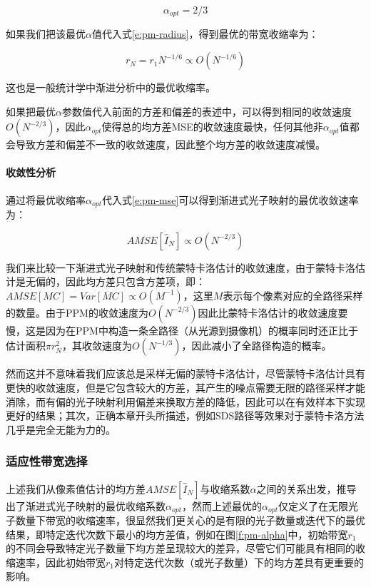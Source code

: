 \begin{equation}
	\alpha_{opt}=2/3
\end{equation}

如果我们把该最优$\alpha$值代入式\ref{e:pm-radius}，得到最优的带宽收缩率为：

\begin{equation}
	r_N=r_1N^{-1/6}\propto O(N^{-1/6})
\end{equation}

这也是一般统计学中渐进分析中的最优收缩率。

如果把最优$\alpha$参数值代入前面的方差和偏差的表述中，可以得到相同的收敛速度$O(N^{-2/3})$，因此$\alpha_{opt}$使得总的均方差MSE的收敛速度最快，任何其他非$\alpha_{opt}$值都会导致方差和偏差不一致的收敛速度，因此整个均方差的收敛速度减慢。





\paragraph{收敛性分析}
通过将最优收缩率$\alpha_{opt}$代入式\ref{e:pm-mse}可以得到渐进式光子映射的最优收敛速率为：

\begin{equation}
	AMSE[\hat{I}_N]\propto O(N^{-2/3})
\end{equation}

我们来比较一下渐进式光子映射和传统蒙特卡洛估计的收敛速度，由于蒙特卡洛估计是无偏的，因此均方差只包含方差项，即：$AMSE[MC]=Var[MC]\propto O(M^{-1})$，这里$M$表示每个像素对应的全路径采样的数量。由于PPM的收敛速度为$O(N^{-2/3})$因此比蒙特卡洛估计的收敛速度要慢，这是因为在PPM中构造一条全路径（从光源到摄像机）的概率同时还正比于估计面积$\pi r^{2}_N$，其收敛速度为$O(N^{-1/3})$，因此减小了全路径构造的概率。

然而这并不意味着我们应该总是采样无偏的蒙特卡洛估计，尽管蒙特卡洛估计具有更快的收敛速度，但是它包含较大的方差，其产生的噪点需要无限的路径采样才能消除，而有偏的光子映射利用偏差来换取方差的降低，因此可以在有效样本下实现更好的结果；其次，正确本章开头所描述，例如SDS路径等效果对于蒙特卡洛方法几乎是完全无能为力的。






\subsubsection{适应性带宽选择}
上述我们从像素值估计的均方差$AMSE[\hat{I}_N]$与收缩系数$\alpha$之间的关系出发，推导出了渐进式光子映射的最优收缩系数$\alpha_{opt}$，然而上述最优的$\alpha_{opt}$仅定义了在无限光子数量下带宽的收缩速率，很显然我们更关心的是有限的光子数量或迭代下的最优结果，即特定迭代次数下最小的均方差值，例如在图\ref{f:pm-alpha}中，初始带宽$r_1$的不同会导致特定光子数量下均方差呈现较大的差异，尽管它们可能具有相同的收缩速率，因此初始带宽$r_1$对特定迭代次数（或光子数量）下的均方差具有更重要的影响。


